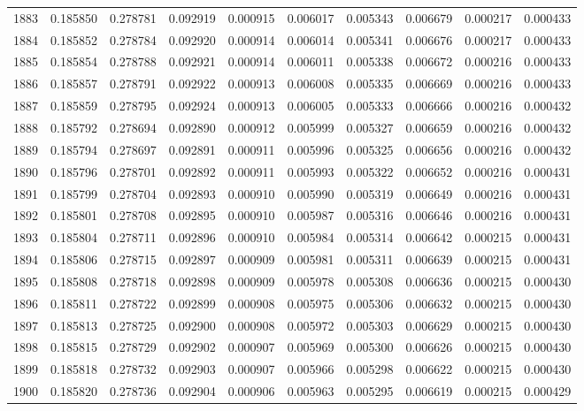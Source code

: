 \begin{tabular}{lrrrrrrrrr}
1883 & 0.185850 & 0.278781 & 0.092919 & 0.000915 & 0.006017 & 0.005343 & 0.006679 & 0.000217 & 0.000433 \\
1884 & 0.185852 & 0.278784 & 0.092920 & 0.000914 & 0.006014 & 0.005341 & 0.006676 & 0.000217 & 0.000433 \\
1885 & 0.185854 & 0.278788 & 0.092921 & 0.000914 & 0.006011 & 0.005338 & 0.006672 & 0.000216 & 0.000433 \\
1886 & 0.185857 & 0.278791 & 0.092922 & 0.000913 & 0.006008 & 0.005335 & 0.006669 & 0.000216 & 0.000433 \\
1887 & 0.185859 & 0.278795 & 0.092924 & 0.000913 & 0.006005 & 0.005333 & 0.006666 & 0.000216 & 0.000432 \\
1888 & 0.185792 & 0.278694 & 0.092890 & 0.000912 & 0.005999 & 0.005327 & 0.006659 & 0.000216 & 0.000432 \\
1889 & 0.185794 & 0.278697 & 0.092891 & 0.000911 & 0.005996 & 0.005325 & 0.006656 & 0.000216 & 0.000432 \\
1890 & 0.185796 & 0.278701 & 0.092892 & 0.000911 & 0.005993 & 0.005322 & 0.006652 & 0.000216 & 0.000431 \\
1891 & 0.185799 & 0.278704 & 0.092893 & 0.000910 & 0.005990 & 0.005319 & 0.006649 & 0.000216 & 0.000431 \\
1892 & 0.185801 & 0.278708 & 0.092895 & 0.000910 & 0.005987 & 0.005316 & 0.006646 & 0.000216 & 0.000431 \\
1893 & 0.185804 & 0.278711 & 0.092896 & 0.000910 & 0.005984 & 0.005314 & 0.006642 & 0.000215 & 0.000431 \\
1894 & 0.185806 & 0.278715 & 0.092897 & 0.000909 & 0.005981 & 0.005311 & 0.006639 & 0.000215 & 0.000431 \\
1895 & 0.185808 & 0.278718 & 0.092898 & 0.000909 & 0.005978 & 0.005308 & 0.006636 & 0.000215 & 0.000430 \\
1896 & 0.185811 & 0.278722 & 0.092899 & 0.000908 & 0.005975 & 0.005306 & 0.006632 & 0.000215 & 0.000430 \\
1897 & 0.185813 & 0.278725 & 0.092900 & 0.000908 & 0.005972 & 0.005303 & 0.006629 & 0.000215 & 0.000430 \\
1898 & 0.185815 & 0.278729 & 0.092902 & 0.000907 & 0.005969 & 0.005300 & 0.006626 & 0.000215 & 0.000430 \\
1899 & 0.185818 & 0.278732 & 0.092903 & 0.000907 & 0.005966 & 0.005298 & 0.006622 & 0.000215 & 0.000430 \\
1900 & 0.185820 & 0.278736 & 0.092904 & 0.000906 & 0.005963 & 0.005295 & 0.006619 & 0.000215 & 0.000429 \\

\end{tabular}
